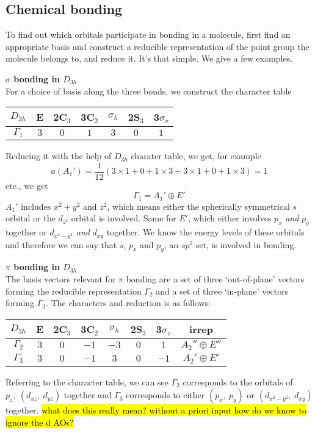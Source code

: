 \subsection{Chemical bonding}
To find out which orbitals participate in bonding in a molecule, first find an appropriate basis and 
construct a reducible representation of the point group the molecule belongs to, 
and reduce it. It's that simple. We give a few examples. \par
\textbf{$\sigma$ bonding in $D_{3h}$}\\
For a choice of basis along the three bonds, we construct the character table
\begin{center}
\begin{tabular}{c|cccccc}
$D_{3h}$ & E & 2C$_3$ & 3C$_2$ & $\sigma_h$ & 2S$_3$ & 3$\sigma_v$\\
\hline
$\Gamma_1$ & $3$ & $0$ & $1$ & $3$ & $0$ & $1$
\end{tabular}
\end{center}
Reducing it with the help of $D_{3h}$ charater table, we get, for example
\begin{equation}
a(A_1')=\frac{1}{12}(3\times1+0+1\times3+3\times1+0+1\times3)=1
\end{equation}
etc., we get 
\begin{equation}
\Gamma_1=A_1'\oplus E'
\end{equation}
$A_1'$ includes $x^2+y^2$ and $z^2$, which means either the spherically symmetrical $s$ orbital or the $d_{z^2}$ orbital is involved. Same for $E'$, which either involves $p_x$ \textit{and} $p_y$ together or $d_{x^2-y^2}$ \textit{and} $d_{xy}$ together. We know the energy levels of these orbitals and therefore we can say that $s$, $p_x$ and $p_y$, \ie an $sp^2$ set, is involved in bonding.\par
\textbf{$\pi$ bonding in $D_{3h}$}\\
The basis vectors relevant for $\pi$ bonding are a set of three `out-of-plane' vectors forming the reducible representation $\Gamma_2$ and a set of three `in-plane' vectors forming $\Gamma_3$. The characters and reduction is as follows:
\begin{center}
\begin{tabular}{c|cccccc|c}
$D_{3h}$ & E & 2C$_3$ & 3C$_2$ & $\sigma_h$ & 2S$_3$ & 3$\sigma_v$ & irrep\\
\hline
$\Gamma_2$ & $3$ & $0$ & $-1$ & $-3$ & $0$ & $1$ &$A_2''\oplus E''$\\
$\Gamma_3$ & $3$ & $0$ & $-1$ & $3$ & $0$ & $-1$ &$A_2'\oplus E'$
\end{tabular}
\end{center}
Referring to the character table, we can see $\Gamma_2$ corresponds to the orbitals of $p_z,\ (d_{xz},\ d_{yz})$ together 
and $\Gamma_3$ corresponds to either $(p_x,\ p_y)$ or $(d_{x^2-y^2},\ d_{xy})$ together. \hl{what does this really mean? without a priori input how do we know to ignore the d AOs?}
